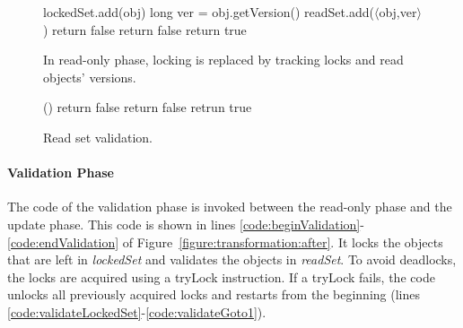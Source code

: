 \begin{figure}
\centering
\begin{minipage}{0.49\textwidth}
\centering
\codesize
\begin{algorithmic}[1]{}
		{\ttfamily
		\State{}lockedSet.add(obj) \label{code:lockedSet:add}
			\State long ver = obj.getVersion() \label{code:track:getVersion}
			\State readSet.add($\langle$obj,ver$\rangle$)
			 \label{code:track:verifyVersion}
				\State return false
			\EndIf
			 \label{code:track:verifyUnlocked}
				\State return false \label{code:track:verifyUnlockedB}
			\EndIf
			\State return true
		\EndFunction
		}
\end{algorithmic}
\caption{In read-only phase, locking is replaced by
tracking locks and read
objects' versions.
\label{figure::track}}
\end{minipage}\hfill
\begin{minipage}{0.47\textwidth}
\centering
\codesize
\begin{algorithmic}[1]{}
		{\ttfamily
		()
			\State return false  \label{code:validate:verifyUnlocked}
			\State {}
			\EndIf
				\State return false  \label{code:validate:verifyVersion}
				\State {}
			\EndIf
		\EndFor
		\State retrun true 
		\EndFunction
		}
\end{algorithmic}
\caption{Read set validation.\label{figure::validate}}
\end{minipage}
\end{figure}


\paragraph{Validation Phase}
The code of the validation phase is invoked between the read-only phase and the update phase.
This code is shown in lines \ref{code:beginValidation}-\ref{code:endValidation} of Figure~\ref{figure:transformation:after}.
It locks the objects that are left in \emph{lockedSet} and validates the objects in \emph{readSet}.
To avoid deadlocks, the locks are acquired using a tryLock
instruction.
If a tryLock fails, the code unlocks  all
previously acquired locks and restarts from the beginning
(lines \ref{code:validateLockedSet}-\ref{code:validateGoto1}).

